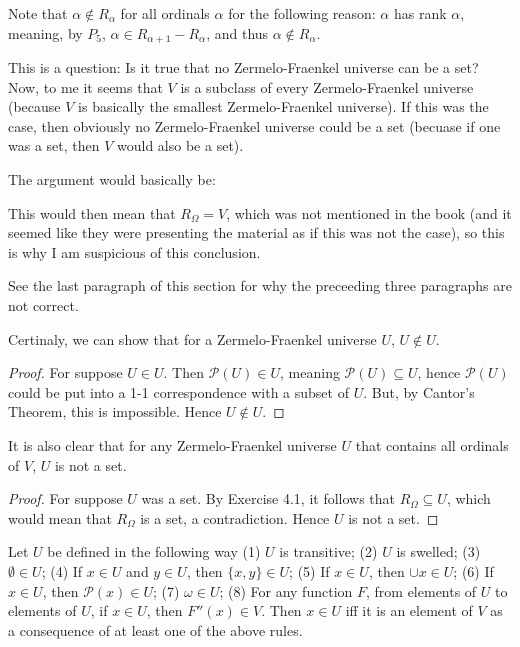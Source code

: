 \documentclass{article}
\theoremstyle{definition}
\begin{document}
Note that $\alpha\notin R_\alpha$ for all ordinals $\alpha$ for the following reason: $\alpha$ has rank $\alpha$, meaning, by $P_5$, 
$\alpha\in R_{\alpha+1}-R_\alpha$, and thus $\alpha\notin R_\alpha$.

This is a question: Is it true that no Zermelo-Fraenkel universe can be a set? Now, to me it seems that 
$V$ is a subclass of every Zermelo-Fraenkel universe (because $V$ is basically the smallest Zermelo-Fraenkel universe). If this was the 
case, then obviously no Zermelo-Fraenkel universe could be a set (becuase if one was a set, then $V$ would also be a set).

The argument would basically be:

This would then mean that $R_\Omega=V$, which was not mentioned in the book (and it seemed like they were presenting the material as if this was 
not the case), so this is why I am suspicious of this conclusion.

See the last paragraph of this section for why the preceeding three paragraphs are not correct.

Certinaly, we can show that for a Zermelo-Fraenkel universe $U$, $U\notin U$.

\begin{proof}
For suppose $U\in U$. Then $\mathcal{P}(U)\in U$, meaning $\mathcal{P}(U)\subseteq U$, hence 
$\mathcal{P}(U)$ could be put into a 1-1 correspondence with a subset of $U$. But, by Cantor's Theorem, this is impossible. Hence 
$U\notin U$. 
\end{proof}

It is also clear that for any Zermelo-Fraenkel universe $U$ that contains all ordinals of 
$V$, $U$ is not a set.

\begin{proof}
For suppose $U$ was a set. By Exercise 4.1, it follows that $R_\Omega\subseteq U$, which would mean that $R_\Omega$ is a set, a contradiction. 
Hence $U$ is not a set.
\end{proof}

Let $U$ be defined in the following way
(1) $U$ is transitive;\newline
(2) $U$ is swelled;\newline
(3) $\emptyset\in U$;\newline
(4) If $x\in U$ and $y\in U$, then $\{x,y\}\in U$;\newline
(5) If $x\in U$, then $\cup x\in U$;\newline
(6) If $x\in U$, then $\mathcal{P}(x)\in U$;\newline
(7) $\omega\in U$;\newline
(8) For any function $F$, from elements of $U$ to elements of $U$, if $x\in U$, then $F''(x)\in V$.\newline
Then $x\in U$ iff it is an element of $V$ as a consequence of at least one of the above rules. 
\end{document}
